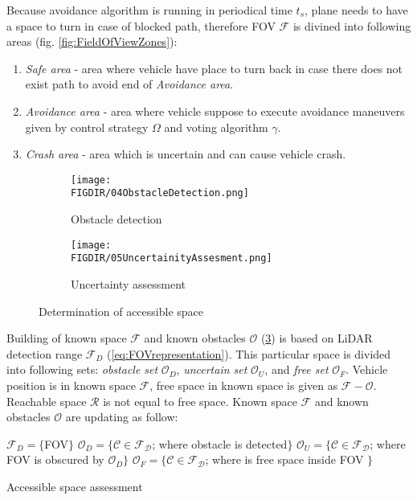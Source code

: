 Because avoidance algorithm is running in periodical time $t_s$, plane needs to have a space to turn in case of blocked path, therefore FOV $\mathscr{F}$ is divined into following areas (fig. \ref{fig:FieldOfViewZones}):
\begin{enumerate}
    \item\textit{Safe area} - area where vehicle have place to turn back in case there does not exist path to avoid end of \textit{Avoidance area}.
    \item\textit{Avoidance area} - area where vehicle suppose to execute avoidance maneuvers given by control strategy $\Omega$ and voting algorithm $\gamma$.
    \item\textit{Crash area} - area which is uncertain and can cause vehicle crash.
\end{enumerate}

\begin{figure}[H]
    \begin{subfigure}{0.5\textwidth}
    \texttt{[image: \\FIGDIR/04ObstacleDetection.png]} 
    \caption{Obstacle detection}
    \label{fig:ObstacleDetection}
    \end{subfigure}
    \begin{subfigure}{0.5\textwidth}
    \texttt{[image: \\FIGDIR/05UncertainityAssesment.png]}
    \caption{Uncertainty assessment}
    \label{fig:UncertaintyAssesment}
    \end{subfigure}
\caption{Determination of accessible space}
\label{fig:AccessibleSpace}
\end{figure}


Building of known space $\mathscr{F}$ and known obstacles $\mathscr{O}$ (\ref{fig:AccessibleSpace}) is based on LiDAR detection range $\mathscr{F}_D$ (\ref{eq:FOVrepresentation}). This particular space is divided into following sets: \textit{obstacle set} $\mathscr{O}_D$, \textit{uncertain set} $\mathscr{O}_U$, and \textit{free set} $\mathscr{O}_F$. Vehicle position is in known space $\mathscr{F}$, free space in known space is given as $\mathscr{F}-\mathscr{O}$. Reachable space $\mathscr{R}$ is not equal to free space. Known space $\mathscr{F}$ and known obstacles $\mathscr{O}$ are updating as follow: 

\begin{algorithm}[H]
 $\mathscr{F}_D=\{$FOV$\}$\;
 $\mathscr{O}_D = \{\mathscr{C}\in\mathscr{F_D}$; where obstacle is detected$\}$ \;
 $\mathscr{O}_U = \{\mathscr{C}\in\mathscr{F_D}$; where FOV is obscured by $ \mathscr{O}_D\}$ \;
 $\mathscr{O}_F = \{\mathscr{C}\in\mathscr{F_D}$; where is free space inside FOV $\}$ \;
 \caption{Accessible space assessment}
\end{algorithm}

